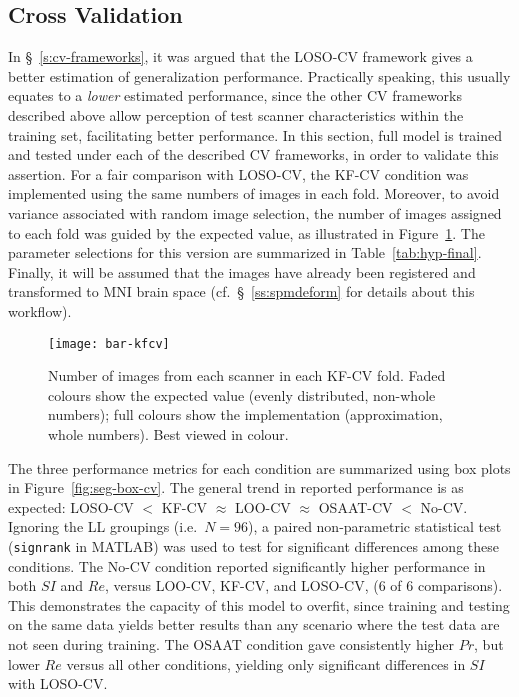 \subsection{Cross Validation}\label{ss:exp-cv}
In \S~\ref{s:cv-frameworks}, it was argued that the LOSO-CV framework
gives a better estimation of generalization performance.
Practically speaking, this usually equates to a \textit{lower} estimated performance,
since the other CV frameworks described above allow perception of test scanner characteristics
within the training set, facilitating better performance.
In this section, full model is trained and tested under each of the described CV frameworks,
in order to validate this assertion.
For a fair comparison with LOSO-CV, the KF-CV condition was implemented
using the same numbers of images in each fold.
Moreover, to avoid variance associated with random image selection,
the number of images assigned to each fold was guided by the expected value,
as illustrated in Figure~\ref{fig:bar-kfcv}.
The parameter selections for this version are summarized in Table~\ref{tab:hyp-final}.
Finally, it will be assumed that
the images have already been registered and transformed to MNI brain space
(cf.~\S~\ref{ss:spmdeform} for details about this workflow).
\par
\begin{figure}
  \centering
  \texttt{[image: bar-kfcv]}
  \caption{Number of images from each scanner in each KF-CV fold.
    Faded colours show the expected value (evenly distributed, non-whole numbers);
    full colours show the implementation (approximation, whole numbers).
    Best viewed in colour.}%
  \label{fig:bar-kfcv}
\end{figure}
The three performance metrics for each condition are
summarized using box plots in Figure~\ref{fig:seg-box-cv}.
The general trend in reported performance is as expected:
LOSO-CV $<$ KF-CV $\approx$ LOO-CV $\approx$ OSAAT-CV $<$ No-CV.
Ignoring the LL groupings (i.e.\ $N = 96$),
a paired non-parametric statistical test (\texttt{signrank} in MATLAB)
was used to test for significant differences among these conditions.
The No-CV condition reported significantly higher performance in both $SI$ and $Re$,
versus LOO-CV, KF-CV, and LOSO-CV, (6 of 6 comparisons).
This demonstrates the capacity of this model to overfit,
since training and testing on the same data yields better results
than any scenario where the test data are not seen during training.
The OSAAT condition gave consistently higher $Pr$, but lower $Re$ %
versus all other conditions, yielding only significant differences in $SI$ with LOSO-CV.
